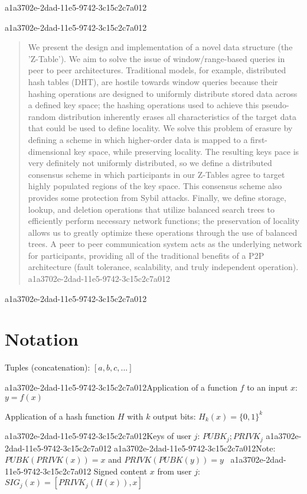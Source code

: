 \documentclass[12pt]{article}
\begin{document}
a1a3702e-2dad-11e5-9742-3c15c2c7a012
\maketitle

a1a3702e-2dad-11e5-9742-3c15c2c7a012\begin{abstract}
We present the design and implementation of a novel data structure (the 'Z-Table'). We aim to solve the issue of window/range-based queries in peer to peer architectures. Traditional models, for example,  distributed hash tables (DHT), are hostile towards window queries because their hashing operations are designed to uniformly distribute stored data across a defined key space; the hashing operations used to achieve this pseudo-random distribution inherently erases all characteristics of the target data that could be used to define locality. We solve this problem of erasure by defining a scheme in which higher-order data is mapped to a first-dimensional key space, while preserving locality. The resulting keys pace is very definitely not uniformly distributed, so we define a distributed consensus scheme in which participants in our Z-Tables agree to target highly populated regions of the key space. This consensus scheme also provides some protection from Sybil attacks. Finally, we define storage, lookup, and deletion operations that utilize balanced search trees to efficiently perform necessary network functions; the preservation of locality allows us to greatly optimize these operations through the use of balanced trees. A peer to peer communication system acts as the underlying network for participants, providing all of the traditional benefits of a P2P architecture (fault tolerance, scalability, and truly independent operation).
a1a3702e-2dad-11e5-9742-3c15c2c7a012\end{abstract}
a1a3702e-2dad-11e5-9742-3c15c2c7a012
\section{Notation}

Tuples (concatenation): $[a,b,c,...]$

a1a3702e-2dad-11e5-9742-3c15c2c7a012Application of a function $f$ to an input $x$: $y=f(x)$

Application of a hash function $H$ with $k$ output bits: $H_{k}(x) = \{0,1\}^k$

a1a3702e-2dad-11e5-9742-3c15c2c7a012Keys of user $j$: $ PUBK_j; PRIVK_j $
a1a3702e-2dad-11e5-9742-3c15c2c7a012
a1a3702e-2dad-11e5-9742-3c15c2c7a012Note: $PUBK(PRIVK(x)) = x$ and $PRIVK(PUBK(y)) = y$~
a1a3702e-2dad-11e5-9742-3c15c2c7a012
Signed content $x$ from user $j$: $SIG_j(x) = \left[ PRIVK_j( H(x) ), x \right]$
\end{document}
